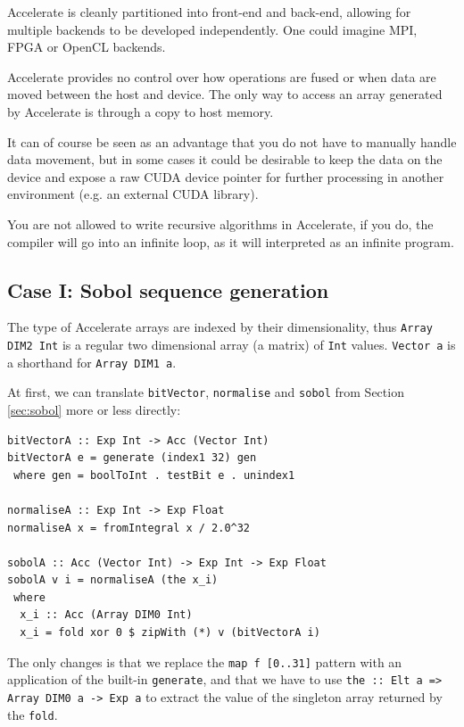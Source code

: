 \documentclass[preprint]{sigplanconf}
\begin{document}

Accelerate is cleanly partitioned into front-end and back-end,
allowing for multiple backends to be developed independently. One
could imagine MPI, FPGA or OpenCL backends.

Accelerate provides no control over how operations are fused or when
data are moved between the host and device. The only way to access an
array generated by Accelerate is through a copy to host memory.

It can of course be seen as an advantage that you do not have to
manually handle data movement, but in some cases it could be desirable
to keep the data on the device and expose a raw CUDA device pointer
for further processing in another environment (e.g. an external CUDA
library).

You are not allowed to write recursive algorithms in Accelerate, if
you do, the compiler will go into an infinite loop, as it will
interpreted as an infinite program.

\subsection{Case I: Sobol sequence generation}
The type of Accelerate arrays are indexed by their dimensionality,
thus \verb|Array DIM2 Int| is a regular two dimensional array (a
matrix) of \verb|Int| values.  \verb|Vector a| is a shorthand for
\verb|Array DIM1 a|.

At first, we can translate \verb|bitVector|, \verb|normalise| and
\verb|sobol| from Section \ref{sec:sobol} more or less directly:
\begin{verbatim}
bitVectorA :: Exp Int -> Acc (Vector Int)
bitVectorA e = generate (index1 32) gen
 where gen = boolToInt . testBit e . unindex1

normaliseA :: Exp Int -> Exp Float
normaliseA x = fromIntegral x / 2.0^32

sobolA :: Acc (Vector Int) -> Exp Int -> Exp Float
sobolA v i = normaliseA (the x_i)
 where
  x_i :: Acc (Array DIM0 Int)
  x_i = fold xor 0 $ zipWith (*) v (bitVectorA i)
\end{verbatim}
The only changes is that we replace the \verb|map f [0..31]| pattern
with an application of the built-in \verb|generate|, and that we have
to use \verb|the :: Elt a => Array DIM0 a -> Exp a| to extract the
value of the singleton array returned by the \verb|fold|.
\end{document}
